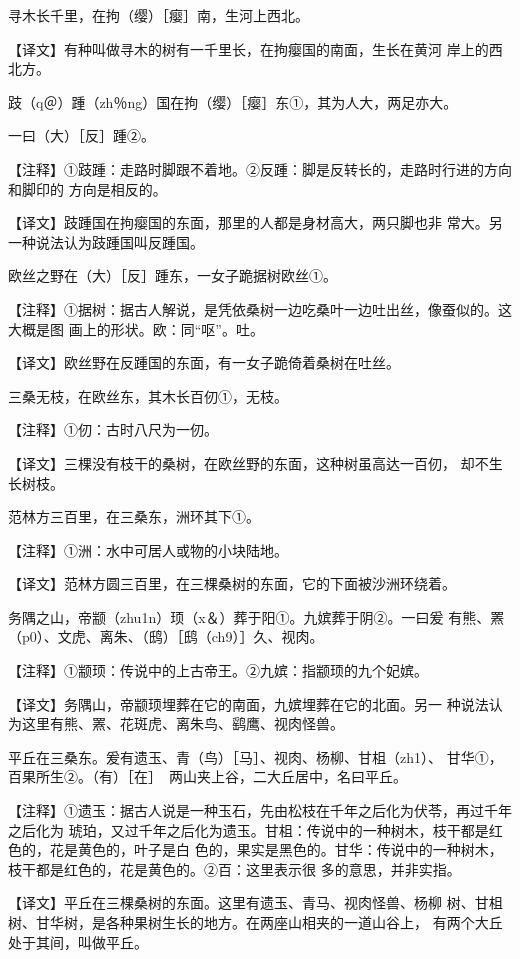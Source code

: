\documentclass[a4paper,12pt,UTF8,twoside]{ctexbook}
\begin{document}
寻木长千里，在拘（缨）［瘿］南，生河上西北。

【译文】有种叫做寻木的树有一千里长，在拘瘿国的南面，生长在黄河 岸上的西北方。

跂（q＠）踵（zh％ng）国在拘（缨）［瘿］东①，其为人大，两足亦大。

一曰（大）［反］踵②。

【注释】①跂踵：走路时脚跟不着地。②反踵：脚是反转长的，走路时行进的方向和脚印的 方向是相反的。

【译文】跂踵国在拘瘿国的东面，那里的人都是身材高大，两只脚也非 常大。另一种说法认为跂踵国叫反踵国。

欧丝之野在（大）［反］踵东，一女子跪据树欧丝①。

【注释】①据树：据古人解说，是凭依桑树一边吃桑叶一边吐出丝，像蚕似的。这大概是图 画上的形状。欧：同“呕”。吐。

【译文】欧丝野在反踵国的东面，有一女子跪倚着桑树在吐丝。

三桑无枝，在欧丝东，其木长百仞①，无枝。

【注释】①仞：古时八尺为一仞。

【译文】三棵没有枝干的桑树，在欧丝野的东面，这种树虽高达一百仞， 却不生长树枝。

范林方三百里，在三桑东，洲环其下①。

【注释】①洲：水中可居人或物的小块陆地。

【译文】范林方圆三百里，在三棵桑树的东面，它的下面被沙洲环绕着。

务隅之山，帝颛（zhu1n）顼（x＆）葬于阳①。九嫔葬于阴②。一曰爰 有熊、罴（p0）、文虎、离朱、（鸱）［鸱（ch9）］久、视肉。

【注释】①颛顼：传说中的上古帝王。②九嫔：指颛顼的九个妃嫔。

【译文】务隅山，帝颛顼埋葬在它的南面，九嫔埋葬在它的北面。另一 种说法认为这里有熊、罴、花斑虎、离朱鸟、鹞鹰、视肉怪兽。

平丘在三桑东。爰有遗玉、青（鸟）［马］、视肉、杨柳、甘柤（zh1）、 甘华①，百果所生②。（有）［在］　两山夹上谷，二大丘居中，名曰平丘。

【注释】①遗玉：据古人说是一种玉石，先由松枝在千年之后化为伏苓，再过千年之后化为 琥珀，又过千年之后化为遗玉。甘柤：传说中的一种树木，枝干都是红色的，花是黄色的，叶子是白 色的，果实是黑色的。甘华：传说中的一种树木，枝干都是红色的，花是黄色的。②百：这里表示很 多的意思，并非实指。

【译文】平丘在三棵桑树的东面。这里有遗玉、青马、视肉怪兽、杨柳 树、甘柤树、甘华树，是各种果树生长的地方。在两座山相夹的一道山谷上， 有两个大丘处于其间，叫做平丘。
\end{document}

